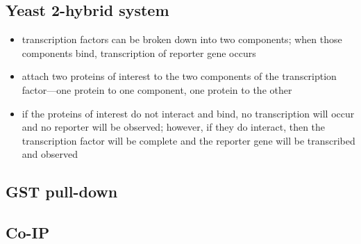 \documentclass[10pt]{article}
\newenvironment{mitemize}
{
  \begin{itemize}
  \setlength{\itemsep}{1pt}
  \setlength{\parskip}{0pt}
  \setlength{\parsep}{0pt}}{\end{itemize}
}
\begin{document}
\subsection*{Yeast 2-hybrid system}
\begin{mitemize}
  \item transcription factors can be broken down into two components; when those components bind, transcription of reporter gene occurs
  \item attach two proteins of interest to the two components of the transcription factor---one protein to one component, one protein to the other
  \item if the proteins of interest do not interact and bind, no transcription will occur and no reporter will be observed; however, if they do interact, then the transcription factor will be complete and the reporter gene will be transcribed and observed
\end{mitemize}

\subsection*{GST pull-down}
\subsection*{Co-IP}
\end{document}
